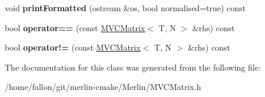 \begin{DoxyCompactItemize}
\mbox{\label{classMVCMatrix_a096d9f2ec91d6dc2375ceedf10bf7be9}} 
void {\bfseries print\+Formatted} (ostream \&os, bool normalised=true) const
\item 
\mbox{\label{classMVCMatrix_a5f77d2b7b76949ef86a07dd88e04c6ad}} 
bool {\bfseries operator==} (const \hyperlink{classMVCMatrix}{M\+V\+C\+Matrix}$<$ T, N $>$ \&rhs) const
\item 
\mbox{\label{classMVCMatrix_a32d6721577af3be9bb9e5f4fe9af156a}} 
bool {\bfseries operator!=} (const \hyperlink{classMVCMatrix}{M\+V\+C\+Matrix}$<$ T, N $>$ \&rhs) const
\end{DoxyCompactItemize}


The documentation for this class was generated from the following file\+:\begin{DoxyCompactItemize}
\item 
/home/fallon/git/merlin-\/cmake/\+Merlin/M\+V\+C\+Matrix.\+h\end{DoxyCompactItemize}

